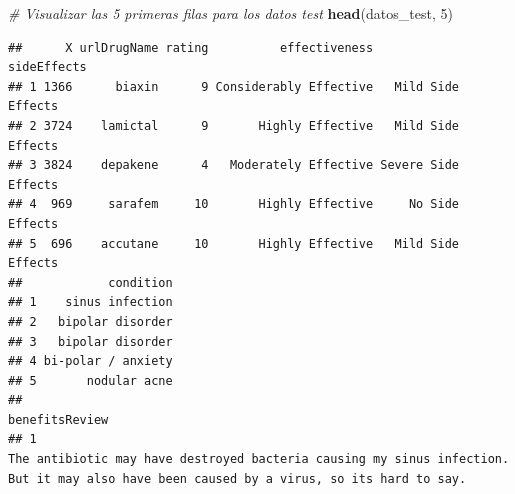 \documentclass[spanish,]{article}
\newenvironment{Shaded}{\begin{snugshade}}{\end{snugshade}}
\newcommand{\CommentTok}[1]{\textcolor[rgb]{0.56,0.35,0.01}{\textit{#1}}}
\newcommand{\DecValTok}[1]{\textcolor[rgb]{0.00,0.00,0.81}{#1}}
\newcommand{\KeywordTok}[1]{\textcolor[rgb]{0.13,0.29,0.53}{\textbf{#1}}}
\newcommand{\NormalTok}[1]{#1}
\begin{document}
\begin{Shaded}
\begin{Highlighting}[]
\CommentTok{# Visualizar las 5 primeras filas para los datos test}
\KeywordTok{head}\NormalTok{(datos_test, }\DecValTok{5}\NormalTok{) }
\end{Highlighting}
\end{Shaded}

\begin{verbatim}
##      X urlDrugName rating          effectiveness         sideEffects
## 1 1366      biaxin      9 Considerably Effective   Mild Side Effects
## 2 3724    lamictal      9       Highly Effective   Mild Side Effects
## 3 3824    depakene      4   Moderately Effective Severe Side Effects
## 4  969     sarafem     10       Highly Effective     No Side Effects
## 5  696    accutane     10       Highly Effective   Mild Side Effects
##            condition
## 1    sinus infection
## 2   bipolar disorder
## 3   bipolar disorder
## 4 bi-polar / anxiety
## 5       nodular acne
##                                                                                                                                                                                                                                                                                                                                                                                                                                                                                                                                                                                                                                                                                                                                                                                                                                                                                                                                        benefitsReview
## 1                                                                                                                                                                                                                                                                                                                                                                                                                                                                                                                                                                                                                                                                                                                                                                                                            The antibiotic may have destroyed bacteria causing my sinus infection.  But it may also have been caused by a virus, so its hard to say.

\end{verbatim}
\end{document}
